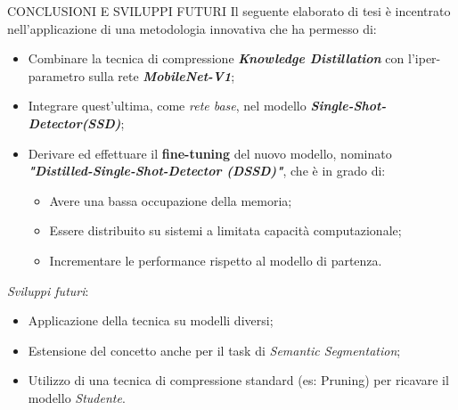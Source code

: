 \begin{frame}{CONCLUSIONI E SVILUPPI FUTURI}
    Il seguente elaborato di tesi è incentrato nell'applicazione di una metodologia innovativa che ha permesso di:
    \begin{itemize}
        \item Combinare la tecnica di compressione {\bfseries{\emph{Knowledge Distillation}}} con l'iper-parametro \boldsymbol{$\alpha$} sulla rete {\bfseries{\emph{MobileNet-V1}}};
        \item Integrare quest'ultima, come \emph{rete base}, nel modello {\bfseries{\emph{Single-Shot-Detector(SSD)}}};
        \item Derivare ed effettuare il {\bfseries{fine-tuning}} del nuovo modello, nominato {\bfseries{\emph{"Distilled-Single-Shot-Detector (DSSD)"}}}, che è in grado di:
        \begin{itemize}
            \item Avere una bassa occupazione della memoria;
            \item Essere distribuito su sistemi a limitata capacità computazionale;
            \item Incrementare le performance rispetto al modello di partenza.
        \end{itemize}
    \end{itemize}
    \vspace{0.3cm}
    \emph{Sviluppi futuri}:
    \begin{itemize}
        \item Applicazione della tecnica su modelli diversi;
        \item Estensione del concetto anche per il task di \emph{Semantic Segmentation};
        \item Utilizzo di una tecnica di compressione standard (es: Pruning) per ricavare il modello \emph{Studente}.
    \end{itemize}
\end{frame}